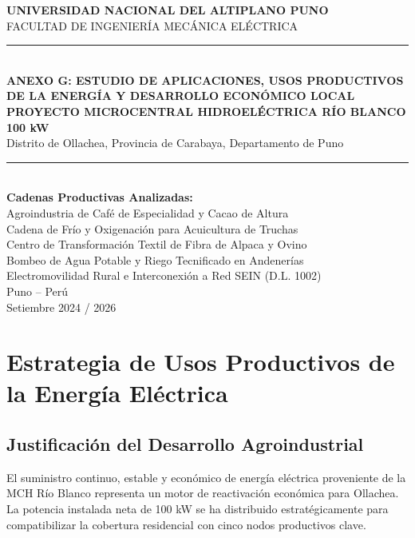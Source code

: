 \documentclass[11pt,a4paper]{report}
\begin{document}
\begin{titlepage}
\begin{center}
    \vspace*{2cm}
    {\Large\bfseries UNIVERSIDAD NACIONAL DEL ALTIPLANO PUNO}\\[0.5em]
    {\large FACULTAD DE INGENIERÍA MECÁNICA ELÉCTRICA}\\[2.5cm]

    \rule{\linewidth}{2pt}\\[0.4cm]
    {\huge\bfseries\color{navyblue} ANEXO G: ESTUDIO DE APLICACIONES, USOS PRODUCTIVOS DE LA ENERGÍA Y DESARROLLO ECONÓMICO LOCAL}\\[0.4cm]
    {\Large\bfseries PROYECTO MICROCENTRAL HIDROELÉCTRICA RÍO BLANCO 100 kW}\\[0.4cm]
    {\large Distrito de Ollachea, Provincia de Carabaya, Departamento de Puno}\\[0.4cm]
    \rule{\linewidth}{2pt}\\[2.5cm]

    \textbf{Cadenas Productivas Analizadas:}\\
    Agroindustria de Café de Especialidad y Cacao de Altura\\
    Cadena de Frío y Oxigenación para Acuicultura de Truchas\\
    Centro de Transformación Textil de Fibra de Alpaca y Ovino\\
    Bombeo de Agua Potable y Riego Tecnificado en Andenerías\\
    Electromovilidad Rural e Interconexión a Red SEIN (D.L. 1002)\\[2cm]

    \vfill
    {\large Puno -- Perú}\\[0.3em]
    {\normalsize Setiembre 2024 / 2026}
\end{center}
\end{titlepage}

\chapter{Estrategia de Usos Productivos de la Energía Eléctrica}
\section{Justificación del Desarrollo Agroindustrial}
El suministro continuo, estable y económico de energía eléctrica proveniente de la MCH Río Blanco representa un motor de reactivación económica para Ollachea. La potencia instalada neta de 100 kW se ha distribuido estratégicamente para compatibilizar la cobertura residencial con cinco nodos productivos clave.
\end{document}
